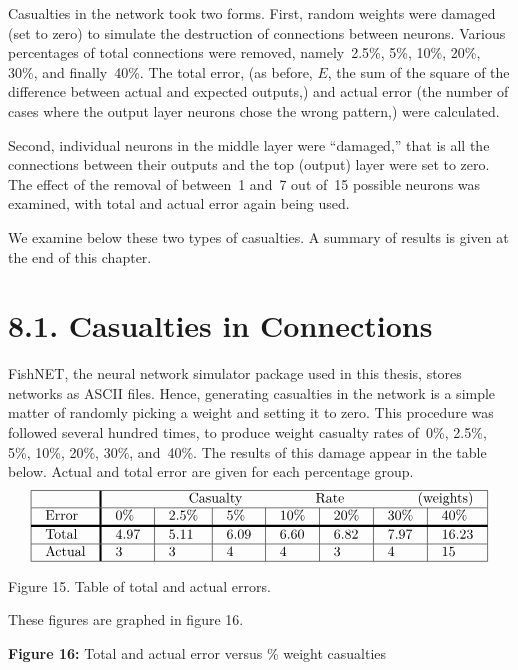 \documentclass[12pt]{report}
\begin{document}
Casualties in the network took two forms.
First, random weights were damaged (set to zero) to
simulate the destruction of connections between neurons.
Various percentages of total connections were removed, namely~2.5\%,
5\%, 10\%, 20\%, 30\%, and finally~40\%.
The total error, (as before, $E$, the sum of the square of the
difference between actual and expected outputs,) and actual error
(the number of cases where the output layer neurons chose the wrong
pattern,) were calculated.

Second, individual neurons in the middle layer were ``damaged,'' that
is all the connections between their outputs and the top (output)
layer were set to zero.
The effect of the removal of between~1 and~7 out of~15 possible
neurons was examined, with total and actual error again being used.

We examine below these two types of casualties.
A summary of results is given at the end of this chapter.

\section{8.1. Casualties in Connections}

FishNET, the neural network simulator package used in this thesis, stores
networks as ASCII files.
Hence, generating casualties in the network is a simple matter of
randomly picking a weight and setting it to zero.
This procedure was followed several hundred times, to produce
weight casualty rates of~0\%, 2.5\%, 5\%, 10\%, 20\%, 30\%, and~40\%.
The results of this damage appear in the table below.
Actual and total error are given for each percentage group.
$$
\vbox{\tabskip=0pt \offinterlineskip

\halign{\strut#& \vrule#\tabskip=1em plus2em&
 #& \vrule width1.5pt#&
 #& \vrule#&
 #& \vrule#&
 #& \vrule#&
 #& \vrule#&
 #& \vrule#&
 #& \vrule#&
 #& \vrule#\tabskip=0pt\cr
\hline
&&&&\multispan{13} Casualty Rate (weights)&\cr
\hline
&&{Error}&&0\%&&2.5\%&&5\%&&10\%&&20\%&&30\%&&40\%&\cr
\noalign{\hrule height1.5pt}
&&{Total}&&4.97&&5.11&&6.09&&6.60&&6.82&&7.97&&16.23&\cr
\hline
&&{Actual}&&3&&3&&4&&4&&3&&4&&15&\cr
\hline
}}
$$
{Figure 15. Table of total and actual errors.}

These figures are graphed in figure 16.

\par\textbf{Figure 16:} Total and actual error versus \% weight casualties
\end{document}
